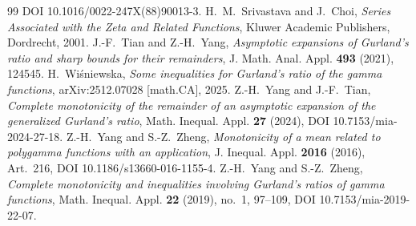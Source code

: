 \documentclass[11pt,a4paper]{amsart}
\theoremstyle{definition}
\begin{document}
\begin{thebibliography}{99}
DOI 10.1016/0022-247X(88)90013-3.
 H.~M.~Srivastava and J.~Choi, \emph{Series Associated with the
Zeta and Related Functions}, Kluwer Academic Publishers, Dordrecht, 2001.
 J.-F.~Tian and Z.-H.~Yang, \emph{Asymptotic expansions of Gurland's
ratio and sharp bounds for their remainders}, J. Math. Anal. Appl. \textbf{493} (2021),
124545.
 H.~Wi\'sniewska, \emph{Some inequalities for Gurland's ratio of the
gamma functions}, arXiv:2512.07028 [math.CA], 2025.
 Z.-H.~Yang and J.-F.~Tian, \emph{Complete monotonicity of the remainder
of an asymptotic expansion of the generalized Gurland's ratio}, Math. Inequal. Appl.
\textbf{27} (2024), DOI 10.7153/mia-2024-27-18.
 Z.-H.~Yang and S.-Z.~Zheng, \emph{Monotonicity of a mean related to
polygamma functions with an application}, J. Inequal. Appl. \textbf{2016} (2016),
Art.~216, DOI 10.1186/s13660-016-1155-4.
 Z.-H.~Yang and S.-Z.~Zheng, \emph{Complete monotonicity and
inequalities involving Gurland's ratios of gamma functions}, Math. Inequal. Appl.
\textbf{22} (2019), no.~1, 97--109, DOI 10.7153/mia-2019-22-07.
\end{thebibliography}
\end{document}
